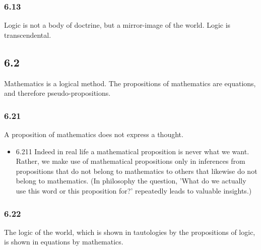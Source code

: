 \documentclass[11pt]{article}
\begin{document}
\subsubsection*{6.13}
\label{sec:org35345f6}
Logic is not a body of doctrine, but a mirror-image of the world.
Logic is transcendental.
\subsection*{6.2}
\label{sec:orgbb3ade3}
Mathematics is a logical method. The propositions of mathematics are
equations, and therefore pseudo-propositions.
\subsubsection*{6.21}
\label{sec:org88dbce4}
A proposition of mathematics does not express a thought.
\begin{itemize}
\item 6.211
\label{sec:orgf651516}
Indeed in real life a mathematical proposition is never what we want.
Rather, we make use of mathematical propositions only in inferences from
propositions that do not belong to mathematics to others that likewise do
not belong to mathematics. (In philosophy the question, 'What do we
actually use this word or this proposition for?' repeatedly leads to
valuable insights.)
\end{itemize}
\subsubsection*{6.22}
\label{sec:org6b87d7d}
The logic of the world, which is shown in tautologies by the
propositions of logic, is shown in equations by mathematics.
\end{document}
